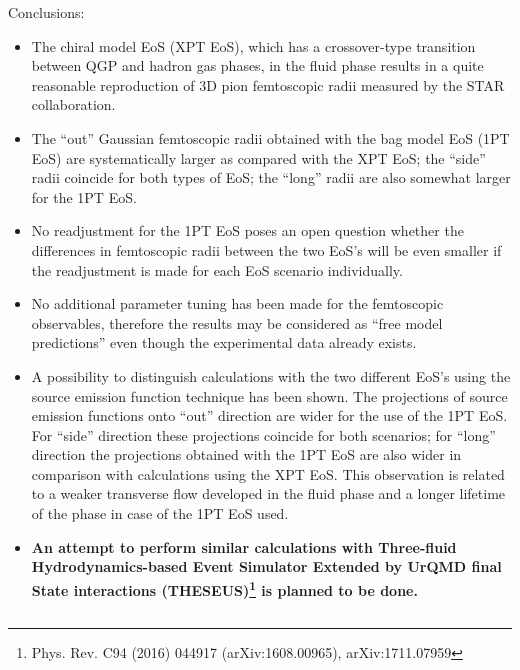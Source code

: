 \documentclass[final,hyperref={pdfpagelabels=false}, xcolor=dvipsnames]{beamer}
\begin{document}
\begin{frame}[shrink=30]
\begin{columns}[t]
 \begin{block}{Conclusions:}
 {\small 
 \begin{itemize}
  \item The chiral model EoS (XPT EoS), which has a crossover-type transition between QGP and hadron gas phases, in the fluid phase results in a quite reasonable reproduction of 3D pion femtoscopic radii measured by the STAR collaboration.
  \item The ``out'' Gaussian femtoscopic radii obtained with the bag model EoS (1PT EoS) are systematically larger as compared with the XPT EoS; the ``side'' radii coincide for both types of EoS; the ``long'' radii are also somewhat larger for the 1PT EoS.
  \item  No readjustment for the 1PT EoS poses an open question whether the differences in femtoscopic radii between the two EoS's will be even smaller if the readjustment is made for each EoS scenario individually. 
  \item No additional parameter tuning has been made for the femtoscopic observables, therefore the results may be considered as ``free model predictions'' even though the experimental data already exists.
  \item  A possibility to distinguish calculations with the two different EoS's using the source emission function technique has been shown. The projections of source emission functions onto ``out'' direction are wider for the use of the 1PT EoS. For ``side'' direction these projections coincide for both scenarios; for ``long'' direction the projections obtained with the 1PT EoS are also wider in comparison with calculations using the XPT EoS. This observation is related to a weaker transverse flow developed in the fluid phase and a longer lifetime of the phase in case of the 1PT EoS used.
  \item {\bf {\color{red} An attempt to perform similar calculations with Three-fluid Hydrodynamics-based Event Simulator Extended by UrQMD final State interactions (THESEUS)}\footnote{Phys. Rev. C94 (2016) 044917 (arXiv:1608.00965),  arXiv:1711.07959}  {\color {red} is planned to be done.}}
 \end{itemize}
 }
\end{block}
 
 \end{columns}
 \end{frame}
\end{document}
